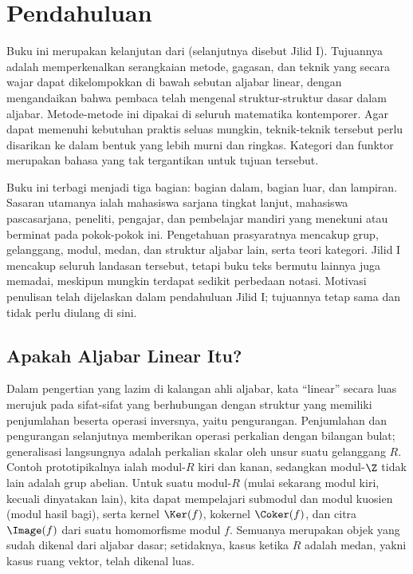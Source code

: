 
\chapter*{Pendahuluan}
\hypertarget{o014.aljabr2.prelude}{ }

Buku ini merupakan kelanjutan dari
\cite{Li1} (selanjutnya disebut Jilid I). Tujuannya adalah memperkenalkan
serangkaian metode, gagasan, dan teknik yang secara wajar dapat dikelompokkan
di bawah sebutan aljabar linear, dengan mengandaikan bahwa pembaca telah
mengenal struktur-struktur dasar dalam aljabar. Metode-metode ini dipakai
di seluruh matematika kontemporer. Agar dapat memenuhi kebutuhan praktis
seluas mungkin, teknik-teknik tersebut perlu disarikan ke dalam bentuk yang
lebih murni dan ringkas. Kategori dan funktor merupakan bahasa yang
tak tergantikan untuk tujuan tersebut.

Buku ini terbagi menjadi tiga bagian: bagian dalam, bagian luar,
dan lampiran. Sasaran utamanya ialah mahasiswa sarjana tingkat lanjut,
mahasiswa pascasarjana, peneliti, pengajar, dan pembelajar mandiri yang
menekuni atau berminat pada pokok-pokok ini. Pengetahuan prasyaratnya
mencakup grup, gelanggang, modul, medan, dan struktur aljabar lain, serta
teori kategori. Jilid I mencakup seluruh landasan tersebut, tetapi buku
teks bermutu lainnya juga memadai, meskipun mungkin terdapat sedikit
perbedaan notasi.
Motivasi penulisan telah dijelaskan dalam pendahuluan Jilid I; tujuannya
tetap sama dan tidak perlu diulang di sini.

\section*{Apakah Aljabar Linear Itu?}
\hypertarget{o014.aljabr2.prelude.linear-algebra}{ }

Dalam pengertian yang lazim di kalangan ahli aljabar, kata ``linear''
secara luas merujuk pada sifat-sifat yang berhubungan dengan struktur
yang memiliki penjumlahan beserta operasi inversnya, yaitu pengurangan.
Penjumlahan dan pengurangan selanjutnya memberikan operasi perkalian
dengan bilangan bulat; generalisasi langsungnya adalah perkalian skalar
oleh unsur suatu gelanggang $R$. Contoh prototipikalnya ialah modul-$R$ kiri
dan kanan, sedangkan modul-$\Z$ tidak lain adalah grup
abelian. Untuk suatu modul-$R$ (mulai sekarang modul kiri, kecuali dinyatakan
lain), kita dapat mempelajari submodul dan modul kuosien (modul hasil bagi),
serta kernel
$\Ker(f)$, kokernel $\Coker(f)$, dan citra $\Image(f)$ dari suatu
homomorfisme modul $f$. Semuanya merupakan objek yang sudah dikenal dari
aljabar dasar; setidaknya, kasus ketika $R$ adalah medan, yakni kasus
ruang vektor, telah dikenal luas.

